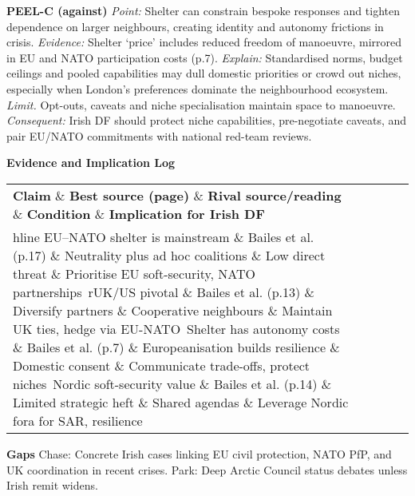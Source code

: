 \textbf{PEEL-C (against)}
\textit{Point:} Shelter can constrain bespoke responses and tighten dependence on larger neighbours, creating identity and autonomy frictions in crisis.
\textit{Evidence:} Shelter ‘price’ includes reduced freedom of manoeuvre, mirrored in EU and NATO participation costs (p.7).
\textit{Explain:} Standardised norms, budget ceilings and pooled capabilities may dull domestic priorities or crowd out niches, especially when London’s preferences dominate the neighbourhood ecosystem.
\textit{Limit.} Opt-outs, caveats and niche specialisation maintain space to manoeuvre.
\textit{Consequent:} Irish DF should protect niche capabilities, pre-negotiate caveats, and pair EU/NATO commitments with national red-team reviews.

\textbf{Evidence and Implication Log}
\begin{tabular}{p{3.2cm}p{4.2cm}p{3.6cm}p{3.2cm}p{4.2cm}}
	\textbf{Claim} \& \textbf{Best source (page)} \& \textbf{Rival source/reading} \& \textbf{Condition} \& \textbf{Implication for Irish DF}\\hline
	EU–NATO shelter is mainstream \& Bailes et al. (p.17) \& Neutrality plus ad hoc coalitions \& Low direct threat \& Prioritise EU soft-security, NATO partnerships\
	rUK/US pivotal \& Bailes et al. (p.13) \& Diversify partners \& Cooperative neighbours \& Maintain UK ties, hedge via EU-NATO\
	Shelter has autonomy costs \& Bailes et al. (p.7) \& Europeanisation builds resilience \& Domestic consent \& Communicate trade-offs, protect niches\
	Nordic soft-security value \& Bailes et al. (p.14) \& Limited strategic heft \& Shared agendas \& Leverage Nordic fora for SAR, resilience\
\end{tabular}

\textbf{Gaps}
Chase: Concrete Irish cases linking EU civil protection, NATO PfP, and UK coordination in recent crises.
Park: Deep Arctic Council status debates unless Irish remit widens.


\parencite{BESSNER_2015}


